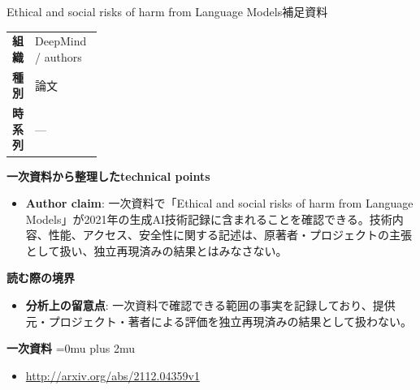 \begin{technicalnote}{Ethical and social risks of harm from Language Models}{補足資料}
\begingroup
\begin{tabularx}{\linewidth}{@{}>{\bfseries}p{0.22\linewidth}X@{}}
組織 & DeepMind / authors \\
種別 & 論文 \\
時系列 & — \\
\end{tabularx}
\smallskip
{\bfseries 一次資料から整理したtechnical points}
\begin{itemize}[leftmargin=1.5em,itemsep=0.35em]
\item \textbf{Author claim}: 一次資料で「Ethical and social risks of harm from Language Models」が2021年の生成AI技術記録に含まれることを確認できる。技術内容、性能、アクセス、安全性に関する記述は、原著者・プロジェクトの主張として扱い、独立再現済みの結果とはみなさない。
\end{itemize}
\begin{minipage}{\linewidth}
{\bfseries 読む際の境界}
\begin{itemize}[leftmargin=1.5em,itemsep=0.35em]
\item \textbf{分析上の留意点}: 一次資料で確認できる範囲の事実を記録しており、提供元・プロジェクト・著者による評価を独立再現済みの結果として扱わない。
\end{itemize}
\begin{samepage}
{\bfseries 一次資料}
\begingroup\sloppy
\Urlmuskip=0mu plus 2mu\relax
\begin{itemize}[leftmargin=1.5em,itemsep=0.25em]
\item {\scriptsize\url{http://arxiv.org/abs/2112.04359v1}}
\end{itemize}
\endgroup
\end{samepage}
\end{minipage}
\endgroup
\end{technicalnote}
\medskip
